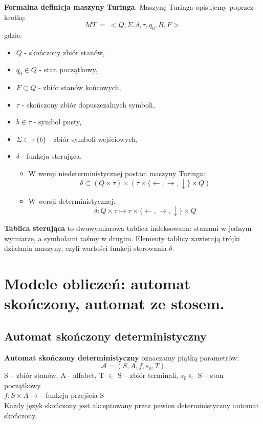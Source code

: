 \documentclass[main.tex]{subfiles}
\begin{document}
    \begin{definition}
        \textbf{Formalna definicja maszyny Turinga}. Maszynę Turinga opisujemy poprzez krotkę:
        \[MT ~ = ~<Q, \Sigma, \delta, \tau, q_0, B, F >\]
        gdzie:
        \begin{itemize}[noitemsep]
            \item $Q$ - skończony zbiór stanów,
            \item $q_0 \in Q$ - stan początkowy,
            \item $F \subset Q$ - zbiór stanów końcowych,
            \item $\tau$  - skończony zbiór dopuszczalnych symboli,
            \item $b \in \tau$  - symbol pusty,
            \item $\Sigma \subset \tau \ \{b\} $ - zbiór symboli wejściowych,
            \item $\delta$ - funkcja sterująca.
            \begin{itemize}[noitemsep]
                \item W wersji niedeterministycznej postaci maszyny Turinga:
                \[ \delta \subset (Q \times \tau)  \times (\tau \times \{\leftarrow, \rightarrow, \downarrow\}  \times Q)\]
                \item W wersji deterministycznej:
                \[ \delta : Q \times \tau \mapsto \tau \times \{\leftarrow, \rightarrow, \downarrow\} \times Q\]
            \end{itemize}
        \end{itemize}

        \textbf{Tablica sterująca} to dwuwymiarowa tablica indeksowana: stanami w jednym wymiarze, a symbolami taśmy w
        drugim. Elementy tablicy zawierają trójki działania maszyny, czyli wartości funkcji sterowania $\delta$.
    \end{definition}


    \section{Modele obliczeń: automat skończony, automat ze stosem.}
    \subsection{Automat skończony deterministyczny}
    \begin{definition}
        \textbf{Automat skończony deterministyczny} oznaczamy piątką parametrów:
        \[\mathcal{A} = (S, A, f, s_{0}, T)\]
        S -- zbiór stanów, A - alfabet, T $\in$ S -- zbiór terminali, $s_{0} \in$ S -- stan początkowy\\
        $f: S\times A \rightarrow$-- funkcja przejścia S \\

        Każdy język skończony jest akceptowany przez pewien deterministyczny automat skończony.
    \end{definition}
\end{document}
